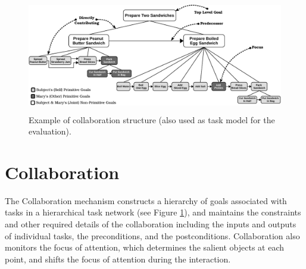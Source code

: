 \documentclass{aamas2016_extendedabstract}
\begin{document}
\begin{figure}
  \centering
  \vspace*{-5mm}
  \includegraphics[width=14.3cm,height=5.0cm]{figure/taskModel-croped.pdf}
  \vspace*{-3mm}
  \caption{Example of collaboration structure (also used as task model for
  the evaluation).}
  \label{fig:taskModel}
  \vspace*{-5mm}
\end{figure}


\section{Collaboration}

The Collaboration mechanism constructs a hierarchy of goals associated with
tasks in a hierarchical task network (see Figure \ref{fig:taskModel}), and
maintains the constraints and other required details of the collaboration
including the inputs and outputs of individual tasks, the preconditions, and the
postconditions. Collaboration also monitors the focus of attention, which
determines the salient objects at each point, and shifts the focus of attention
during the interaction.
\end{document}
